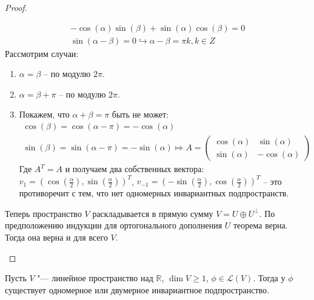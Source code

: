 \begin{proof}
\begin{enumerate}
        \begin{gather*}
            -\cos(\alpha) \sin(\beta) + \sin(\alpha) \cos(\beta) = 0 \\
            \sin(\alpha - \beta) = 0 \hookrightarrow \alpha - \beta = \pi k, k \in Z
        \end{gather*}
        Рассмотрим случаи:
        \begin{enumerate}
            \item $\alpha = \beta$ -- по модулю $2\pi$.
            \item $\alpha = \beta + \pi$ -- по модулю $2\pi$.
            \item Покажем, что $\alpha + \beta = \pi$ быть не может:
            \begin{gather*}
                \cos(\beta) = \cos(\alpha - \pi) = -\cos(\alpha) \\
                \sin(\beta) = \sin(\alpha - \pi) = -\sin(\alpha) \Mapsto
                A = \begin{pmatrix}
                        \cos(\alpha)     & \sin(\alpha) \\
                        \sin(\alpha)     & -\cos(\alpha)       
                    \end{pmatrix}
            \end{gather*}
            Где $A^T = A$ и получаем два собственных вектора: $v_1 = (\cos(\frac{\alpha}{2}), \sin(\frac{\alpha}{2}))^T$, $v_{-1} = (-\sin(\frac{\alpha}{2}), \cos(\frac{\alpha}{2}))^T$ -- это противоречит с тем, что нет одномерных инвариантных подпространств.
        \end{enumerate}
        Теперь пространство $V$ раскладывается в прямую сумму $V = U \oplus U^{\perp}$. По предположению индукции для ортогонального дополнения $U$ теорема верна. Тогда она верна и для всего $V$.
    \end{enumerate}
\end{proof}

\begin{proposition}
    Пусть $V$ "--- линейное пространство над $\mathbb{R}$, $\dim{V} \ge 1$, $\phi \in \mathcal{L}(V)$. Тогда у $\phi$ существует одномерное или двумерное инвариантное подпространство.
\end{proposition}

